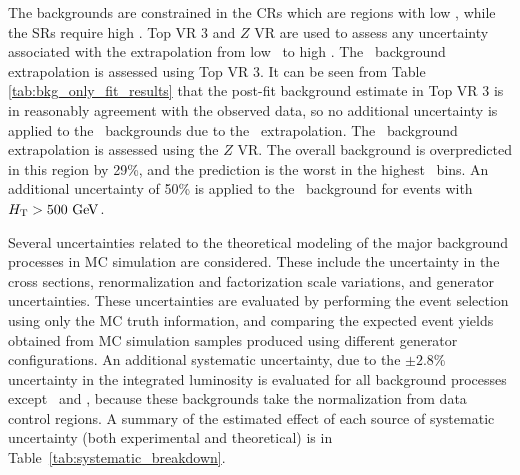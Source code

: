 The backgrounds are constrained in the CRs which are regions with low \HT,
while the SRs require high \HT.
Top VR 3 and $Z$ VR are used to assess any uncertainty associated with the
extrapolation from low \HT\ to high \HT.
The \TTBAR\ background extrapolation is assessed using Top VR 3. It can be seen
from Table \ref{tab:bkg_only_fit_results} that the post-fit background estimate
in Top VR 3 is in reasonably agreement with the observed data, so no additional
uncertainty is applied to the \TTBAR\ backgrounds due to the \HT\ extrapolation.
The \ZGAMMAJETS\ background extrapolation is assessed using the $Z$ VR.
The overall background is overpredicted in this region by 29\%, and the
prediction is the worst in the highest \HT\ bins.
An additional uncertainty of 50\% is applied to the \ZGAMMAJETS\ background
for events with $\HT > 500 \GeV$.

Several uncertainties related to the theoretical modeling of the major
background processes in MC simulation are considered.
These include the uncertainty in the cross sections, renormalization and
factorization scale variations, and generator uncertainties.
These uncertainties are evaluated by performing the event selection using only
the MC truth information, and comparing the expected event yields obtained
from MC simulation samples produced using different generator configurations.
An additional systematic uncertainty, due to the $\pm 2.8$\% uncertainty in the
integrated luminosity is evaluated for all background processes except
\TTBAR\ and \ZGAMMAJETS, because these backgrounds take the normalization from
data control regions.
A summary of the estimated effect of each source of systematic uncertainty
(both experimental and theoretical) is in Table~\ref{tab:systematic_breakdown}.

